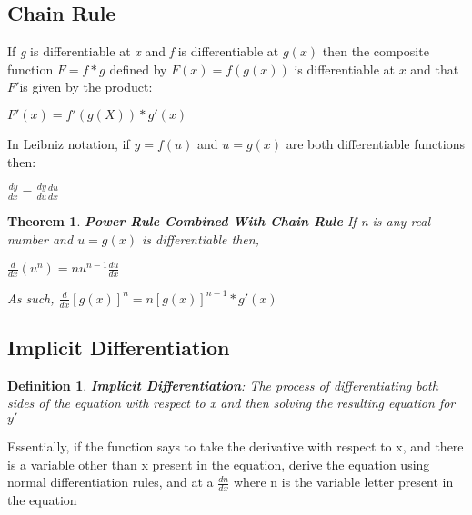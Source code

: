 \documentclass[10pt,a4paper]{article}
\newtheorem{theorem}{Theorem}
\newtheorem{definition}{Definition}
\begin{document}
	\subsection{Chain Rule}
		If \textit{g} is differentiable at \textit{x} and \textit{f} is differentiable at $g(x)$ then the composite function $F = f*g$ defined by $F(x) = f(g(x))$ is differentiable at $x$ and that $F'$is given by the product:
		\begin{center}
			$F'(x) = f'(g(X)) * g'(x)$	
		\end{center}
		In Leibniz notation, if $y=f(u)$ and $u=g(x)$ are both differentiable functions then:
		\begin{center}
			$\frac{dy}{dx} = \frac{dy}{du}\frac{du}{dx}$
		\end{center}
		\begin{theorem}
			\textbf{Power Rule Combined With Chain Rule} If \textit{n} is any real number and $u=g(x)$ is differentiable then,
			\begin{center}
				$\frac{d}{dx}(u^{n}) = nu^{n-1}\frac{du}{dx}$
			\end{center}
			As such, $\frac{d}{dx}[g(x)]^{n} = n[g(x)]^{n-1} * g'(x)$
		\end{theorem}
	\subsection{Implicit Differentiation}
	\begin{definition}
		\textbf{Implicit Differentiation}: The process of differentiating both sides of the equation with respect to x and then solving the resulting equation for $y'$
	\end{definition}
	Essentially, if the function says to take the derivative with respect to x, and there is a variable other than x present in the equation, derive the equation using normal differentiation rules, and at a $\frac{dn}{dx}$ where n is the variable letter present in the equation
\end{document}
